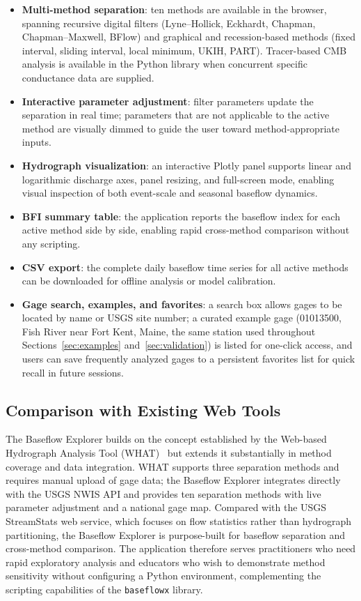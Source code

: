 \documentclass[hydrology,article,submit,pdftex,moreauthors]{Definitions/mdpi}
\begin{document}
\begin{itemize}[nosep]
\item \textbf{Multi-method separation}: ten methods are available in the browser, spanning recursive digital filters (Lyne--Hollick, Eckhardt, Chapman, Chapman--Maxwell, BFlow) and graphical and recession-based methods (fixed interval, sliding interval, local minimum, UKIH, PART). Tracer-based CMB analysis is available in the Python library when concurrent specific conductance data are supplied.
\item \textbf{Interactive parameter adjustment}: filter parameters update the separation in real time; parameters that are not applicable to the active method are visually dimmed to guide the user toward method-appropriate inputs.
\item \textbf{Hydrograph visualization}: an interactive Plotly panel supports linear and logarithmic discharge axes, panel resizing, and full-screen mode, enabling visual inspection of both event-scale and seasonal baseflow dynamics.
\item \textbf{BFI summary table}: the application reports the baseflow index for each active method side by side, enabling rapid cross-method comparison without any scripting.
\item \textbf{CSV export}: the complete daily baseflow time series for all active methods can be downloaded for offline analysis or model calibration.
\item \textbf{Gage search, examples, and favorites}: a search box allows gages to be located by name or USGS site number; a curated example gage (01013500, Fish River near Fort Kent, Maine, the same station used throughout Sections~\ref{sec:examples} and~\ref{sec:validation}) is listed for one-click access, and users can save frequently analyzed gages to a persistent favorites list for quick recall in future sessions.
\end{itemize}

\subsection{Comparison with Existing Web Tools}
\label{sec:webapp_comparison}

The Baseflow Explorer builds on the concept established by the Web-based Hydrograph Analysis Tool (WHAT)~\cite{Lim2005} but extends it substantially in method coverage and data integration. WHAT supports three separation methods and requires manual upload of gage data; the Baseflow Explorer integrates directly with the USGS NWIS API and provides ten separation methods with live parameter adjustment and a national gage map. Compared with the USGS StreamStats web service, which focuses on flow statistics rather than hydrograph partitioning, the Baseflow Explorer is purpose-built for baseflow separation and cross-method comparison. The application therefore serves practitioners who need rapid exploratory analysis and educators who wish to demonstrate method sensitivity without configuring a Python environment, complementing the scripting capabilities of the \texttt{baseflowx} library.
\end{document}

